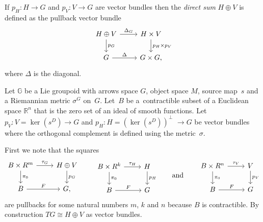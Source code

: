 \documentclass[10pt,a4paper]{amsart}
\numberwithin{equation}{section}
\begin{document}
\begin{Definition}If $p_H\colon H\rightarrow G$ and $p_V\colon V\rightarrow G$ are vector bundles then the \emph{direct sum} $H\oplus V$ is def\/ined as the pullback vector bundle
\begin{equation*}
\begin{tikzcd}
H\oplus V \dar{p_G} \rar{\Delta_G} & H\times V \dar{p_H\times p_V}\\
G \rar{\Delta} & G\times G,
\end{tikzcd}
\end{equation*}
where $\Delta$ is the diagonal.
\end{Definition}

\begin{Notation}Let $\mathbb{G}$ be a Lie groupoid with arrows space $G$, object space $M$, source map~$s$ and a Riemannian metric $\sigma^G$ on~$G$. Let~$B$ be a~contractible subset of a Euclidean space $\mathbb{R}^n$ that is the zero set of an ideal of smooth functions. Let $p_V\colon V=\ker(s^D)\rightarrow G$ and $p_H\colon H=(\ker(s^D))^{\perp}$ $\rightarrow G$ be vector bundles where the orthogonal complement is def\/ined using the metric~$\sigma$.
\end{Notation}

First we note that the squares
\begin{equation*}
\begin{tikzcd}
B\times R^m \rar{\tau_G} \dar{\pi_0} & H\oplus V \dar{p_G}\\
B \rar{F} & G,
\end{tikzcd}
\qquad
\begin{tikzcd}
B\times R^k \rar{\tau_H} \dar{\pi_0} & H \dar{p_H}\\
B \rar{F} & G
\end{tikzcd}
\qquad \text{and}\qquad
\begin{tikzcd}
B\times R^n \rar{\tau_V} \dar{\pi_0} & V \dar{p_V}\\
B \rar{F} & G
\end{tikzcd}
\end{equation*}
are pullbacks for some natural numbers $m$, $k$ and $n$ because $B$ is contractible. By construction $TG\cong H\oplus V$ as vector bundles.
\end{document}
